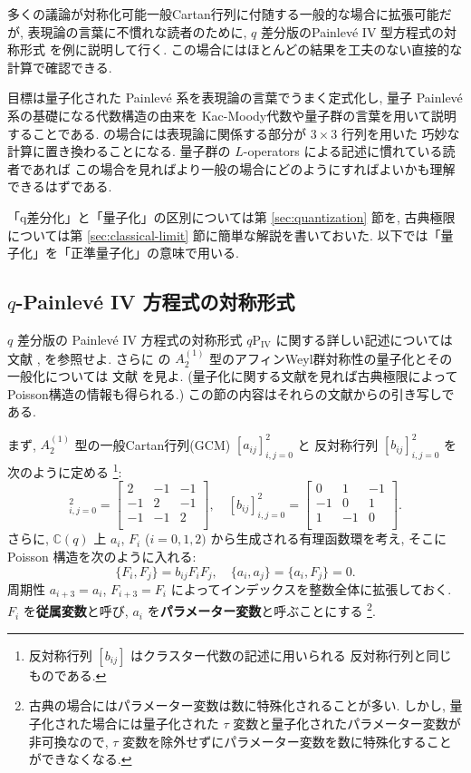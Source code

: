 \documentclass[12pt,twoside,dvipdfm]{msjproc}
\newcommand\C{{\mathbb C}} %
\theoremstyle{definition} %
\theoremstyle{definition} %
\theoremstyle{definition} %
\numberwithin{theorem}{section}
\numberwithin{equation}{section}
\numberwithin{figure}{section}
\numberwithin{table}{section}
\newcommand\secref[1]{第 \ref{#1} 節}
\newcommand\qP[1]{{\text{$q\mathrm{P}_{\text{#1}}$}}}
\begin{document}
多くの議論が対称化可能一般Cartan行列に付随する一般的な場合に拡張可能だが, 
表現論の言葉に不慣れな読者のために, 
$q$ 差分版のPainlev\'e IV 型方程式の対称形式 \qP{IV} を例に説明して行く.
この場合にはほとんどの結果を工夫のない直接的な計算で確認できる.

目標は量子化された Painlev\'e 系を表現論の言葉でうまく定式化し, 
量子 Painlev\'e 系の基礎になる代数構造の由来を
Kac-Moody代数や量子群の言葉を用いて説明することである.
\qP{IV}の場合には表現論に関係する部分が $3\times 3$ 行列を用いた
巧妙な計算に置き換わることになる.
量子群の $L$-operators による記述に慣れている読者であれば
この場合を見ればより一般の場合にどのようにすればよいかも理解できるはずである.

「q差分化」と「量子化」の区別については\secref{sec:quantization}を, 
古典極限については\secref{sec:classical-limit}に簡単な解説を書いておいた.
以下では「量子化」を「正準量子化」の意味で用いる.



\subsection{$q$-Painlev\'e IV 方程式の対称形式 \qP{IV}}

$q$ 差分版の Painlev\'e IV 方程式の対称形式 $\qP{IV}$ に関する詳しい記述については
文献 \cite{KNY-qPIV}, \cite{Noumi-AWG} を参照せよ.
さらに \qP{IV} の $A^{(1)}_2$ 型のアフィンWeyl群対称性の量子化とその一般化については
文献  \cite{Hasegawa-QB} を見よ. 
(量子化に関する文献を見れば古典極限によってPoisson構造の情報も得られる.)
この節の内容はそれらの文献からの引き写しである. 

まず, $A^{(1)}_2$ 型の一般Cartan行列(GCM) $[a_{ij}]_{i,j=0}^2$ と
反対称行列 $[b_{ij}]_{i,j=0}^2$ を次のように定める%
\footnote{反対称行列 $[b_{ij}]$ はクラスター代数の記述に用いられる
反対称行列と同じものである.}:
\begin{equation*}
  [a_{ij}]_{i,j=0}^2 = 
  \begin{bmatrix}
     2 & -1 & -1 \\
   -1 &  2 & -1 \\
   -1 & -1 & 2 \\
  \end{bmatrix},
  \quad
  [b_{ij}]_{i,j=0}^2 =
  \begin{bmatrix}
      0 & 1 & -1 \\
    -1 & 0 & 1   \\
     1 & -1 & 0 \\
  \end{bmatrix}.
\end{equation*}
さらに, $\C(q)$ 上 $a_i$, $F_i$ ($i=0,1,2)$ から生成される有理函数環を考え, 
そこに Poisson 構造を次のように入れる:
\begin{equation*}
 \{F_i, F_j\} = b_{ij} F_i F_j, \quad \{a_i,a_j\}=\{a_i,F_j\}=0.
\end{equation*}
周期性 $a_{i+3}=a_i$, $F_{i+3}=F_i$ によってインデックスを整数全体に拡張しておく.
$F_i$ を{\bf 従属変数}と呼び, $a_i$ を{\bf パラメーター変数}と呼ぶことにする%
\footnote{古典の場合にはパラメーター変数は数に特殊化されることが多い.
しかし, 量子化された場合には量子化された $\tau$ 変数と量子化されたパラメーター変数が
非可換なので, $\tau$ 変数を除外せずにパラメーター変数を数に特殊化することができなくなる.}.
\end{document}
